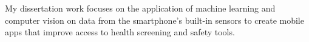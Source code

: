 \justify
My dissertation work focuses on the application of machine learning and computer vision on data from the smartphone’s built-in sensors to create mobile apps that improve access to health screening and safety tools. 